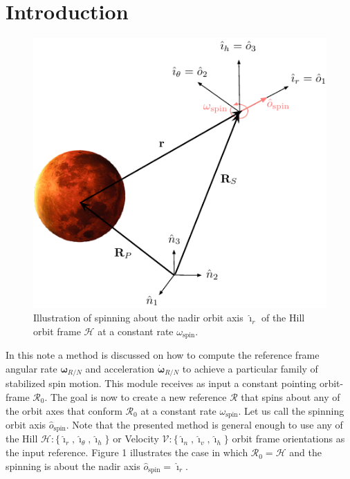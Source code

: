 \documentclass[]{AVSSimReportMemo}
\begin{document}
\section{Introduction}
\begin{figure}[htb]
	\centerline{
	\includegraphics{Figures/Fig1}
	}
	\caption{Illustration of spinning about the nadir orbit axis $\bm\hat{\imath}_{r}$ of the Hill orbit frame $\mathcal{H}$  at a constant rate $\omega_{\textrm{spin}}$.}
	\label{fig:Fig1}
\end{figure}
In this note a method is discussed on how to compute the reference frame angular rate $\bm\omega_{R/N}$ and acceleration $\dot{\bm\omega}_{R/N}$ to achieve a particular family of stabilized spin motion. This module receives as input a constant pointing orbit-frame $\mathcal{R}_{0}$. The goal is now to create a new reference $\mathcal{R}$ that spins about any of the orbit axes that conform $\mathcal{R}_{0}$  at a constant rate $\omega_{\textrm{spin}}$. Let us call the spinning orbit axis $\hat {o}_{\textrm{spin}}$. Note that the presented method is general enough to use any of the Hill $\mathcal{H}:\{ \hat{\bm\imath}_{r}, \hat{\bm\imath}_{\theta}, \hat{\bm\imath}_{h} \}$ or Velocity $\mathcal{V}:\{ \hat{\bm\imath}_{n}, \hat{\bm\imath}_{v}, \hat{\bm\imath}_{h} \}$ orbit frame orientations as the input reference. Figure 1 illustrates the case in which $\mathcal{R}_{0} = \mathcal{H}$ and the spinning is about the nadir axis $\hat {o}_{\textrm{spin}} = \hat{\bm\imath}_{r}$.
\end{document}

